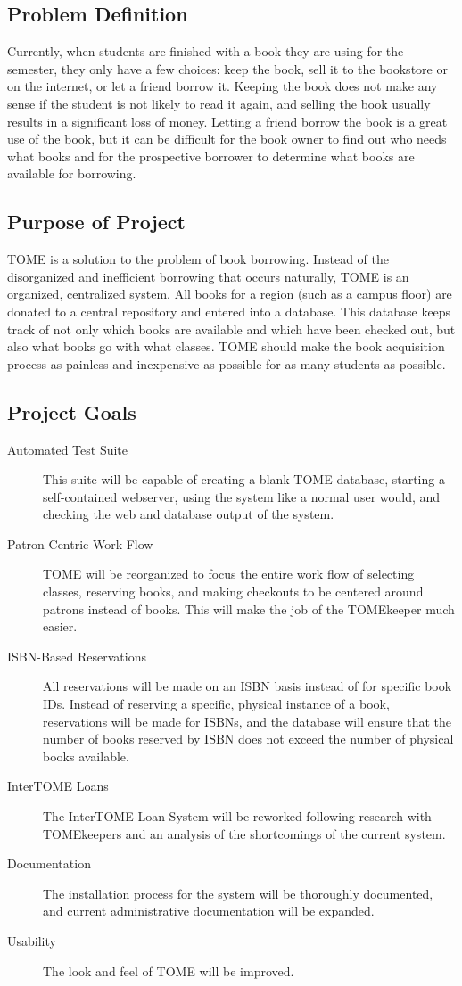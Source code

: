 \documentclass[12pt,titlepage]{article}
\begin{document}
\subsection{Problem Definition}
Currently, when students are finished with a book they are using for the semester, they only have a few choices: keep the book, sell it to the bookstore or on the internet, or let a friend borrow it.  Keeping the book does not make any sense if the student is not likely to read it again, and selling the book usually results in a significant loss of money.  Letting a friend borrow the book is a great use of the book, but it can be difficult for the book owner to find out who needs what books and for the prospective borrower to determine what books are available for borrowing.
\subsection{Purpose of Project}
TOME is a solution to the problem of book borrowing.  Instead of the disorganized and inefficient borrowing that occurs naturally, TOME is an organized, centralized system.  All books for a region (such as a campus floor) are donated to a central repository and entered into a database.  This database keeps track of not only which books are available and which have been checked out, but also what books go with what classes.  TOME should make the book acquisition process as painless and inexpensive as possible for as many students as possible.
\subsection{Project Goals}
\begin{description}
	\item[Automated Test Suite] This suite will be capable of creating a blank TOME database, starting a self-contained webserver, using the system like a normal user would, and checking the web and database output of the system.
	\item[Patron-Centric Work Flow] TOME will be reorganized to focus the entire work flow of selecting classes, reserving books, and making checkouts to be centered around patrons instead of books.  This will make the job of the TOMEkeeper much easier.
	\item[ISBN-Based Reservations] All reservations will be made on an ISBN basis instead of for specific book IDs.  Instead of reserving a specific, physical instance of a book, reservations will be made for ISBNs, and the database will ensure that the number of books reserved by ISBN does not exceed the number of physical books available.
	\item[InterTOME Loans] The InterTOME Loan System will be reworked following research with TOMEkeepers and an analysis of the shortcomings of the current system.
	\item[Documentation] The installation process for the system will be thoroughly documented, and current administrative documentation will be expanded.
	\item[Usability] The look and feel of TOME will be improved.
\end{description}
\end{document}
